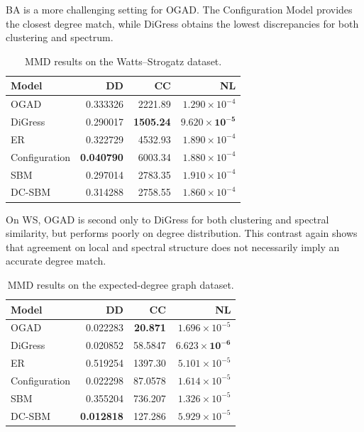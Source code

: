BA is a more challenging setting for OGAD.
The Configuration Model provides the closest degree match, while DiGress obtains the lowest discrepancies for both clustering and spectrum.

\begin{table}[H]
    \centering
    \caption{MMD results on the Watts--Strogatz dataset.}
    \label{tab:exp_ws}
    \begin{tabular}{lrrr}
        \hline
        Model & DD & CC & NL \\
        \hline
        OGAD          & 0.333326 & 2221.89 & \(1.290\times10^{-4}\) \\
        DiGress       & 0.290017 & \textbf{1505.24} & \(\mathbf{9.620\times10^{-5}}\) \\
        ER            & 0.322729 & 4532.93 & \(1.890\times10^{-4}\) \\
        Configuration & \textbf{0.040790} & 6003.34 & \(1.880\times10^{-4}\) \\
        SBM           & 0.297014 & 2783.35 & \(1.910\times10^{-4}\) \\
        DC-SBM        & 0.314288 & 2758.55 & \(1.860\times10^{-4}\) \\
        \hline
    \end{tabular}
\end{table}

On WS, OGAD is second only to DiGress for both clustering and spectral similarity, but performs poorly on degree distribution.
This contrast again shows that agreement on local and spectral structure does not necessarily imply an accurate degree match.

\begin{table}[H]
    \centering
    \caption{MMD results on the expected-degree graph dataset.}
    \label{tab:exp_edg}
    \begin{tabular}{lrrr}
        \hline
        Model & DD & CC & NL \\
        \hline
        OGAD          & 0.022283 & \textbf{20.871} & \(1.696\times10^{-5}\) \\
        DiGress       & 0.020852 & 58.5847 & \(\mathbf{6.623\times10^{-6}}\) \\
        ER            & 0.519254 & 1397.30 & \(5.101\times10^{-5}\) \\
        Configuration & 0.022298 & 87.0578 & \(1.614\times10^{-5}\) \\
        SBM           & 0.355204 & 736.207 & \(1.326\times10^{-5}\) \\
        DC-SBM        & \textbf{0.012818} & 127.286 & \(5.929\times10^{-5}\) \\
        \hline
    \end{tabular}
\end{table}

